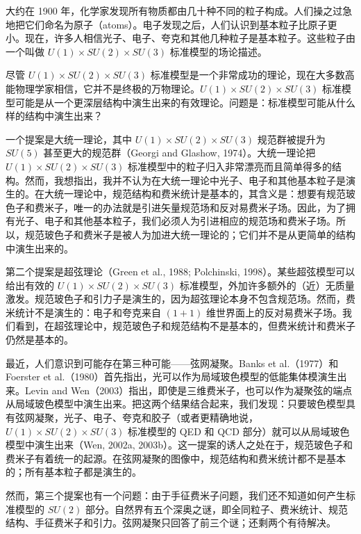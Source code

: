 大约在 1900 年，化学家发现所有物质都由几十种不同的粒子构成。人们操之过急地把它们命名为原子（atoms）。电子发现之后，人们认识到基本粒子比原子更小。现在，许多人相信光子、电子、夸克和其他几种粒子是基本粒子。这些粒子由一个叫做 $U(1)\times SU(2)\times SU(3)$ 标准模型的场论描述。

尽管 $U(1)\times SU(2)\times SU(3)$ 标准模型是一个非常成功的理论，现在大多数高能物理学家相信，它并不是终极的万物理论。$U(1)\times SU(2)\times SU(3)$ 标准模型可能是从一个更深层结构中演生出来的有效理论。问题是：标准模型可能从什么样的结构中演生出来？

一个提案是大统一理论，其中 $U(1)\times SU(2)\times SU(3)$ 规范群被提升为 $SU(5)$ 甚至更大的规范群（Georgi and Glashow, 1974）。大统一理论把 $U(1)\times SU(2)\times SU(3)$ 标准模型中的粒子归入非常漂亮而且简单得多的结构。然而，我想指出，我并不认为在大统一理论中光子、电子和其他基本粒子是演生的。在大统一理论中，规范结构和费米统计是基本的，其含义是：想要有规范玻色子和费米子，唯一的办法就是引进矢量规范场和反对易费米子场。因此，为了拥有光子、电子和其他基本粒子，我们必须人为引进相应的规范场和费米子场。所以，规范玻色子和费米子是被人为加进大统一理论的；它们并不是从更简单的结构中演生出来的。

第二个提案是超弦理论（Green et al., 1988; Polchinski, 1998）。某些超弦模型可以给出有效的 $U(1)\times SU(2)\times SU(3)$ 标准模型，外加许多额外的（近）无质量激发。规范玻色子和引力子是演生的，因为超弦理论本身不包含规范场。然而，费米统计不是演生的：电子和夸克来自 $(1+1)$ 维世界面上的反对易费米子场。我们看到，在超弦理论中，规范玻色子和规范结构不是基本的，但费米统计和费米子仍然是基本的。

最近，人们意识到可能存在第三种可能——弦网凝聚。Banks et al.（1977）和 Foerster et al.（1980）首先指出，光可以作为局域玻色模型的低能集体模演生出来。Levin and Wen（2003）指出，即使是三维费米子，也可以作为凝聚弦的端点从局域玻色模型中演生出来。把这两个结果结合起来，我们发现：只要玻色模型具有弦网凝聚，光子、电子、夸克和胶子（或者更精确地说，$U(1)\times SU(2)\times SU(3)$ 标准模型的 QED 和 QCD 部分）就可以从局域玻色模型中演生出来（Wen, 2002a, 2003b）。这一提案的诱人之处在于，规范玻色子和费米子有着统一的起源。在弦网凝聚的图像中，规范结构和费米统计都不是基本的；所有基本粒子都是演生的。

然而，第三个提案也有一个问题：由于手征费米子问题，我们还不知道如何产生标准模型的 $SU(2)$ 部分。自然界有五个深奥之谜，即全同粒子、费米统计、规范结构、手征费米子和引力。弦网凝聚只回答了前三个谜；还剩两个有待解决。

